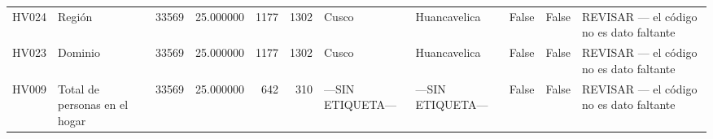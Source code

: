 \begin{longtable}{llrrrrllrrl}
HV024 & Región & 33569 & 25.000000 & 1177 & 1302 & Cusco & Huancavelica & False & False & REVISAR — el código no es dato faltante \\
HV023 & Dominio & 33569 & 25.000000 & 1177 & 1302 & Cusco & Huancavelica & False & False & REVISAR — el código no es dato faltante \\
HV009 & Total de personas en el hogar & 33569 & 25.000000 & 642 & 310 & —SIN ETIQUETA— & —SIN ETIQUETA— & False & False & REVISAR — el código no es dato faltante \\
\end{longtable}
